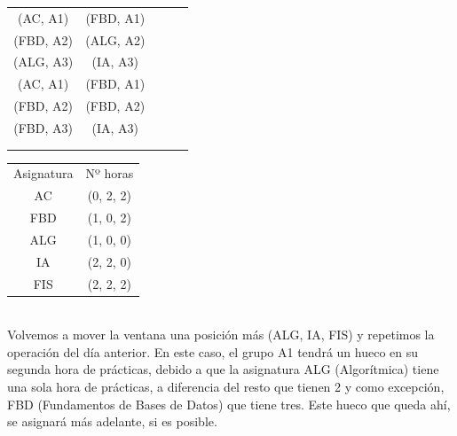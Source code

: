 \begin{minipage}{0.5\textwidth}    
\begin{tabular}{| c | c | c | c | c |}
\hline
 (AC, A1) & (FBD, A1) &  &  & \\
 (FBD, A2) & (ALG, A2) &  &  & \\
 (ALG, A3) &  (IA, A3) &  &  & \\
 \hline
 (AC, A1) & (FBD, A1) &  &  & \\
 (FBD, A2) & (FBD, A2) &  &  & \\
 (FBD, A3) & (IA, A3) &  &  & \\
 \hline
 &  &  &  & \\
 \hline
 &  &  &  & \\
 \hline 
\end{tabular}
\end{minipage}
\begin{minipage}{0.5\textwidth}
\begin{tabular}{c | c}
Asignatura & Nº horas \\
AC & (0, 2, 2) \\
FBD & (1, 0, 2) \\
ALG & (1, 0, 0) \\
IA & (2, 2, 0) \\
FIS & (2, 2, 2)
\end{tabular}
\end{minipage}
~\\

Volvemos a mover la ventana una posición más (ALG, IA, FIS) y repetimos la operación del día anterior. En este caso, el grupo A1 tendrá un hueco en su segunda hora de prácticas, debido a que la asignatura ALG (Algorítmica) tiene una sola hora de prácticas, a diferencia del resto que tienen 2 y como excepción, FBD (Fundamentos de Bases de Datos) que tiene tres. Este hueco que queda ahí, se asignará más adelante, si es posible.\\

